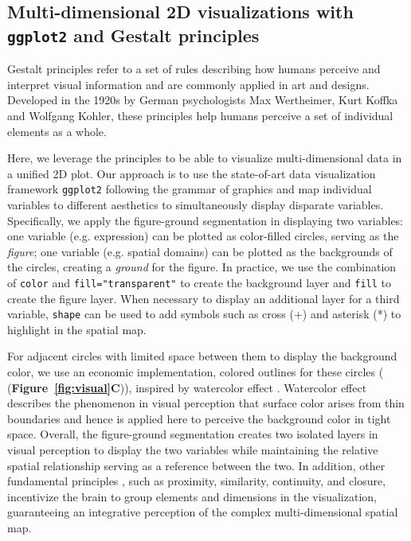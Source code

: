 \documentclass[10pt,twocolumn]{article}
\newcommand{\fixme}[1]{{\color{red} (#1)}}
\begin{document}
\subsection{Multi-dimensional 2D visualizations with \texttt{ggplot2} and Gestalt principles}

Gestalt principles\cite{todorovic_2008, palmer_1999} refer to a set of rules describing how humans perceive and interpret visual information and are commonly applied in art and designs. Developed in the 1920s by German psychologists Max Wertheimer, Kurt Koffka and Wolfgang Kohler, these principles help humans perceive a set of individual elements as a whole. 

Here, we leverage the principles to be able to visualize multi-dimensional data in a unified 2D plot. Our approach is to use the state-of-art data visualization framework \texttt{ggplot2} \cite{ggplot2} following the grammar of graphics \cite{wilkinson_2012} and map individual variables to different aesthetics to simultaneously display disparate variables. Specifically, we apply the figure-ground segmentation \cite{peterson_2010} in displaying two variables: one variable (e.g. expression) can be plotted as color-filled circles, serving as the \textit{figure}; one variable (e.g. spatial domains) can be plotted as the backgrounds of the circles, creating a \textit{ground} for the figure. In practice, we use the combination of \texttt{color} and \texttt{fill="transparent"} to create the background layer and \texttt{fill} to create the figure layer. When necessary to display an additional layer for a third variable, \texttt{shape} can be used to add symbols such as cross (+) and asterisk (*) to highlight in the spatial map.


For adjacent circles with limited space between them to display the background color, we use an economic implementation, colored outlines for these circles (\fixme{\textbf{Figure~\ref{fig:visual}C}}), inspired by watercolor effect \cite{pinna_1987, pinna_2001}. Watercolor effect describes the phenomenon in visual perception that surface color arises from thin boundaries and hence is applied here to perceive the background color in tight space. Overall, the figure-ground segmentation creates two isolated layers in visual perception to display the two variables while maintaining the relative spatial relationship serving as a reference between the two. In addition, other fundamental principles \cite{todorovic_2008}, such as proximity, similarity, continuity, and closure, incentivize the brain to group elements and dimensions in the visualization, guaranteeing an integrative perception of the complex multi-dimensional spatial map.
\end{document}
